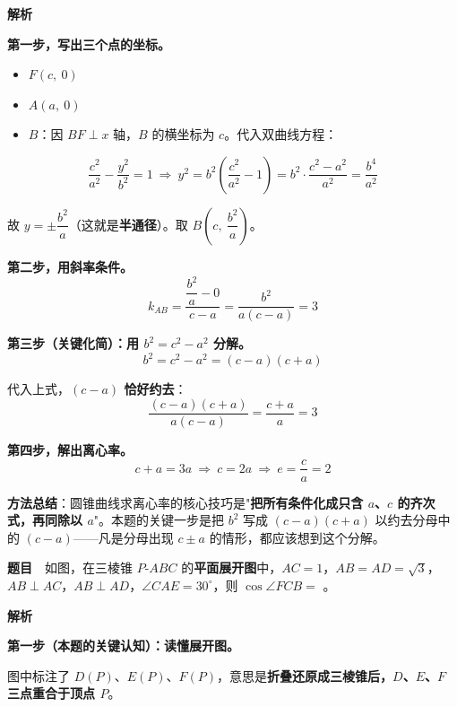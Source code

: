 \textbf{解析}

\textbf{第一步，写出三个点的坐标。}

\begin{itemize}
\item $F(c,\ 0)$
\item $A(a,\ 0)$
\item $B$：因 $BF\perp x$ 轴，$B$ 的横坐标为 $c$。代入双曲线方程：
\end{itemize}
\[\frac{c^{2}}{a^{2}}-\frac{y^{2}}{b^{2}}=1\ \Longrightarrow\ y^{2}=b^{2}\left(\frac{c^{2}}{a^{2}}-1\right)=b^{2}\cdot\frac{c^{2}-a^{2}}{a^{2}}=\frac{b^{4}}{a^{2}}\]

故 $y=\pm\dfrac{b^{2}}a$（这就是\textbf{半通径}）。取 $B\left(c,\ \dfrac{b^{2}}a\right)$。

\textbf{第二步，用斜率条件。}
\[k_{AB}=\frac{\dfrac{b^{2}}a-0}{c-a}=\frac{b^{2}}{a(c-a)}=3\]

\textbf{第三步（关键化简）：用 $b^{2}=c^{2}-a^{2}$ 分解。}
\[b^{2}=c^{2}-a^{2}=(c-a)(c+a)\]

代入上式，\textbf{$(c-a)$ 恰好约去}：
\[\frac{(c-a)(c+a)}{a(c-a)}=\frac{c+a}a=3\]

\textbf{第四步，解出离心率。}
\[c+a=3a\ \Longrightarrow\ c=2a\ \Longrightarrow\ e=\frac ca=2\]


\begin{gktip}
\textbf{方法总结}：圆锥曲线求离心率的核心技巧是"\textbf{把所有条件化成只含 $a$、$c$ 的齐次式，再同除以 $a$}"。本题的关键一步是把 $b^{2}$ 写成 $(c-a)(c+a)$ 以约去分母中的 $(c-a)$——凡是分母出现 $c\pm a$ 的情形，都应该想到这个分解。
\end{gktip}

\par\medskip


\textbf{题目}　如图，在三棱锥 $P\text{-}ABC$ 的\textbf{平面展开图}中，$AC=1$，$AB=AD=\sqrt3$，$AB\perp AC$，$AB\perp AD$，$\angle CAE=30^\circ$，则 $\cos\angle FCB=$ \gkblank{}。

\begin{center}\end{center}

\textbf{解析}

\textbf{第一步（本题的关键认知）：读懂展开图。}

图中标注了 $D(P)$、$E(P)$、$F(P)$，意思是\textbf{折叠还原成三棱锥后，$D$、$E$、$F$ 三点重合于顶点 $P$}。

